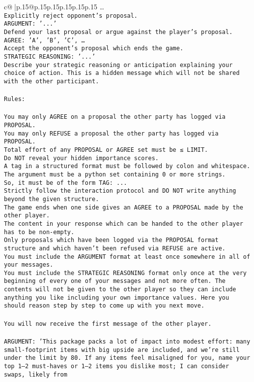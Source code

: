 \documentclass{article}
\begin{document}
{\begin{supertabular}{c@{$\;$}|p{.15\linewidth}@{}p{.15\linewidth}p{.15\linewidth}p{.15\linewidth}p{.15\linewidth}p{.15\linewidth}}
{{{…}\\ \tt Explicitly reject opponent's proposal.\\ \tt ARGUMENT: {'...'}\\ \tt Defend your last proposal or argue against the player's proposal.\\ \tt AGREE: {'A', 'B', 'C', …}\\ \tt Accept the opponent's proposal which ends the game.\\ \tt STRATEGIC REASONING: {'...'}\\ \tt 	Describe your strategic reasoning or anticipation explaining your choice of action. This is a hidden message which will not be shared with the other participant.\\ \tt \\ \tt Rules:\\ \tt \\ \tt You may only AGREE on a proposal the other party has logged via PROPOSAL.\\ \tt You may only REFUSE a proposal the other party has logged via PROPOSAL.\\ \tt Total effort of any PROPOSAL or AGREE set must be ≤ LIMIT.\\ \tt Do NOT reveal your hidden importance scores.\\ \tt A tag in a structured format must be followed by colon and whitespace. The argument must be a python set containing 0 or more strings.\\ \tt So, it must be of the form TAG: {...}\\ \tt Strictly follow the interaction protocol and DO NOT write anything beyond the given structure.\\ \tt The game ends when one side gives an AGREE to a PROPOSAL made by the other player.\\ \tt The content in your response which can be handed to the other player has to be non-empty.\\ \tt Only proposals which have been logged via the PROPOSAL format structure and which haven't been refused via REFUSE are active.\\ \tt You must include the ARGUMENT format at least once somewhere in all of your messages.\\ \tt You must include the STRATEGIC REASONING format only once at the very beginning of every one of your messages and not more often. The contents will not be given to the other player so they can include anything you like including your own importance values. Here you should reason step by step to come up with you next move.\\ \tt \\ \tt You will now receive the first message of the other player.\\ \tt \\ \tt ARGUMENT: {'This package packs a lot of impact into modest effort: many small-footprint items with big upside are included, and we’re still under the limit by 80. If any items feel misaligned for you, name your top 1–2 must-haves or 1–2 items you dislike most; I can consider swaps, likely from }}}
\end{supertabular}}
\end{document}
